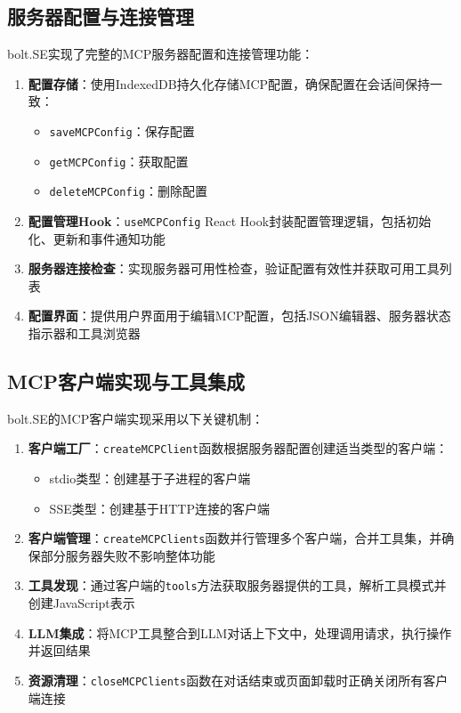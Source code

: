 \subsection{服务器配置与连接管理}
bolt.SE实现了完整的MCP服务器配置和连接管理功能：

\begin{enumerate}
  \item \textbf{配置存储}：使用IndexedDB持久化存储MCP配置，确保配置在会话间保持一致：
    \begin{itemize}
      \item \texttt{saveMCPConfig}：保存配置
      \item \texttt{getMCPConfig}：获取配置
      \item \texttt{deleteMCPConfig}：删除配置
    \end{itemize}
  
  \item \textbf{配置管理Hook}：\texttt{useMCPConfig} React Hook封装配置管理逻辑，包括初始化、更新和事件通知功能
  
  \item \textbf{服务器连接检查}：实现服务器可用性检查，验证配置有效性并获取可用工具列表
  
  \item \textbf{配置界面}：提供用户界面用于编辑MCP配置，包括JSON编辑器、服务器状态指示器和工具浏览器
\end{enumerate}

\subsection{MCP客户端实现与工具集成}
bolt.SE的MCP客户端实现采用以下关键机制：

\begin{enumerate}
  \item \textbf{客户端工厂}：\texttt{createMCPClient}函数根据服务器配置创建适当类型的客户端：
    \begin{itemize}
      \item stdio类型：创建基于子进程的客户端
      \item SSE类型：创建基于HTTP连接的客户端
    \end{itemize}
  
  \item \textbf{客户端管理}：\texttt{createMCPClients}函数并行管理多个客户端，合并工具集，并确保部分服务器失败不影响整体功能
  
  \item \textbf{工具发现}：通过客户端的\texttt{tools}方法获取服务器提供的工具，解析工具模式并创建JavaScript表示
  
  \item \textbf{LLM集成}：将MCP工具整合到LLM对话上下文中，处理调用请求，执行操作并返回结果
  
  \item \textbf{资源清理}：\texttt{closeMCPClients}函数在对话结束或页面卸载时正确关闭所有客户端连接
\end{enumerate}

